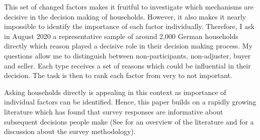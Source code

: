 \documentclass[ProjectABM]{subfiles}
\begin{document}








This set of changed factors makes it fruitful to investigate which mechanisms are decisive in the decision making of households. However, it also makes it nearly impossible to identify the importance of each factor individually. Therefore, I ask in August 2020 a representative sample of around 2,000 German households directly which reason played a decisive role in their decision making process. My questions allow me to distinguish between non-participants, non-adjuster, buyer and seller. Each type receives a set of reasons which could be influential in their decision. The task is then to rank each factor from very to not important.

Asking households directly is appealing in this context as importance of individual factors can be identified. Hence, this paper builds on a rapidly growing literature which has found that survey responses are informative about subsequent decisions people make (See \cite{manski2018_survey} for an overview of the literature and \cite{choi_2020} for a discussion about the survey methodology).%
\end{document}
